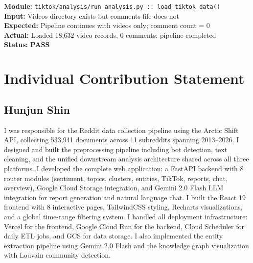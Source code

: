 \documentclass[12pt, letterpaper]{article}
\newenvironment{testblock}[1]{%
  \begin{mdframed}[
    backgroundcolor=testbg,
    linecolor=testframe,
    linewidth=1.5pt,
    frametitle={\color{testframe}\bfseries\small Test Case: #1},
    frametitlebackgroundcolor=testframe!15
  ]
}{%
  \end{mdframed}
}
\begin{document}
\begin{testblock}{UT-E05 --- TikTok pipeline handles missing comments file}
\textbf{Module:} \texttt{tiktok/analysis/run\_analysis.py :: load\_tiktok\_data()}\\
\textbf{Input:} Videos directory exists but comments file does not\\
\textbf{Expected:} Pipeline continues with videos only; comment count = 0\\
\textbf{Actual:} Loaded 18,632 video records, 0 comments; pipeline completed\\
\textbf{Status:} \textcolor{commentgreen}{\textbf{PASS}}
\end{testblock}

\section{Individual Contribution Statement}
\label{app:contributions}

\subsection*{Hunjun Shin}
I was responsible for the Reddit data collection pipeline using the Arctic Shift API, collecting 533,941 documents across 11 subreddits spanning 2013--2026. I designed and built the preprocessing pipeline including bot detection, text cleaning, and the unified downstream analysis architecture shared across all three platforms. I developed the complete web application: a FastAPI backend with 8 router modules (sentiment, topics, clusters, entities, TikTok, reports, chat, overview), Google Cloud Storage integration, and Gemini 2.0 Flash LLM integration for report generation and natural language chat. I built the React 19 frontend with 8 interactive pages, TailwindCSS styling, Recharts visualizations, and a global time-range filtering system. I handled all deployment infrastructure: Vercel for the frontend, Google Cloud Run for the backend, Cloud Scheduler for daily ETL jobs, and GCS for data storage. I also implemented the entity extraction pipeline using Gemini 2.0 Flash and the knowledge graph visualization with Louvain community detection.
\end{document}
